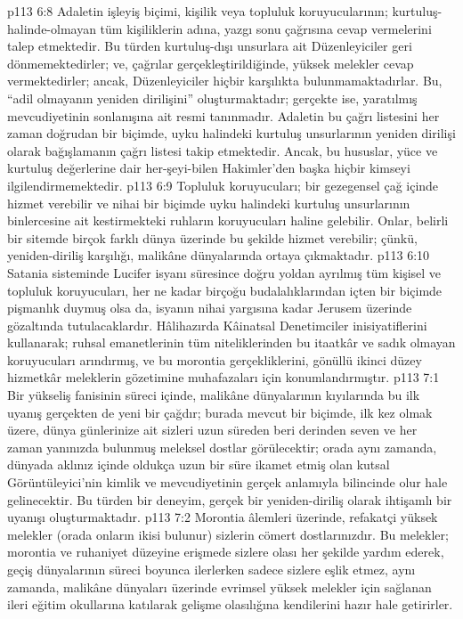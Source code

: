 \vs p113 6:8 Adaletin işleyiş biçimi, kişilik veya topluluk koruyucularının; kurtuluş\hyp{}halinde\hyp{}olmayan tüm kişiliklerin adına, yazgı sonu çağrısına cevap vermelerini talep etmektedir. Bu türden kurtuluş\hyp{}dışı unsurlara ait Düzenleyiciler geri dönmemektedirler; ve, çağrılar gerçekleştirildiğinde, yüksek melekler cevap vermektedirler; ancak, Düzenleyiciler hiçbir karşılıkta bulunmamaktadırlar. Bu, “adil olmayanın yeniden dirilişini” oluşturmaktadır; gerçekte ise, yaratılmış mevcudiyetinin sonlanışına ait resmi tanınmadır. Adaletin bu çağrı listesini her zaman doğrudan bir biçimde, uyku halindeki kurtuluş unsurlarının yeniden dirilişi olarak bağışlamanın çağrı listesi takip etmektedir. Ancak, bu hususlar, yüce ve kurtuluş değerlerine dair her\hyp{}şeyi\hyp{}bilen Hakimler’den başka hiçbir kimseyi ilgilendirmemektedir.
\vs p113 6:9 Topluluk koruyucuları; bir gezegensel çağ içinde hizmet verebilir ve nihai bir biçimde uyku halindeki kurtuluş unsurlarının binlercesine ait kestirmekteki ruhların koruyucuları haline gelebilir. Onlar, belirli bir sitemde birçok farklı dünya üzerinde bu şekilde hizmet verebilir; çünkü, yeniden\hyp{}diriliş karşılığı, malikâne dünyalarında ortaya çıkmaktadır.
\vs p113 6:10 Satania sisteminde Lucifer isyanı süresince doğru yoldan ayrılmış tüm kişisel ve topluluk koruyucuları, her ne kadar birçoğu budalalıklarından içten bir biçimde pişmanlık duymuş olsa da, isyanın nihai yargısına kadar Jerusem üzerinde gözaltında tutulacaklardır. Hâlihazırda Kâinatsal Denetimciler inisiyatiflerini kullanarak; ruhsal emanetlerinin tüm niteliklerinden bu itaatkâr ve sadık olmayan koruyucuları arındırmış, ve bu morontia gerçekliklerini, gönüllü ikinci düzey hizmetkâr meleklerin gözetimine muhafazaları için konumlandırmıştır.
\vs p113 7:1 Bir yükseliş fanisinin süreci içinde, malikâne dünyalarının kıyılarında bu ilk uyanış gerçekten de yeni bir çağdır; burada mevcut bir biçimde, ilk kez olmak üzere, dünya günlerinize ait sizleri uzun süreden beri derinden seven ve her zaman yanınızda bulunmuş meleksel dostlar görülecektir; orada aynı zamanda, dünyada aklınız içinde oldukça uzun bir süre ikamet etmiş olan kutsal Görüntüleyici’nin kimlik ve mevcudiyetinin gerçek anlamıyla bilincinde olur hale gelinecektir. Bu türden bir deneyim, gerçek bir yeniden\hyp{}diriliş olarak ihtişamlı bir uyanışı oluşturmaktadır.
\vs p113 7:2 Morontia âlemleri üzerinde, refakatçi yüksek melekler (orada onların ikisi bulunur) sizlerin cömert dostlarınızdır. Bu melekler; morontia ve ruhaniyet düzeyine erişmede sizlere olası her şekilde yardım ederek, geçiş dünyalarının süreci boyunca ilerlerken sadece sizlere eşlik etmez, aynı zamanda, malikâne dünyaları üzerinde evrimsel yüksek melekler için sağlanan ileri eğitim okullarına katılarak gelişme olasılığına kendilerini hazır hale getirirler.
